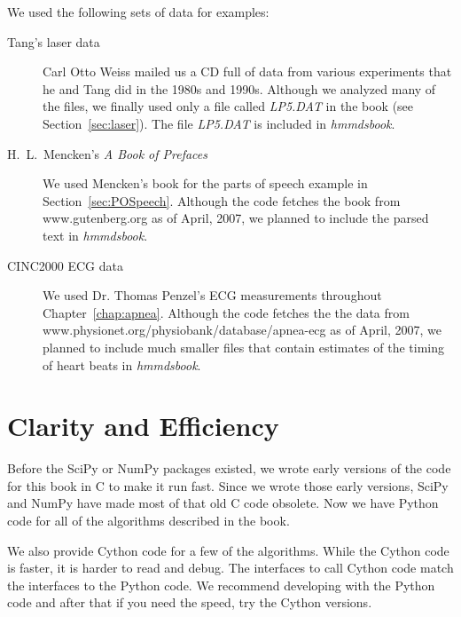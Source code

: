 We used the following sets of data for examples:
\begin{description}
\item[Tang's laser data] Carl Otto Weiss  mailed
  us a CD full of data from various experiments that he and Tang did
  in the 1980s and 1990s.  Although we analyzed many of the files, we
  finally used only a file called \emph{LP5.DAT} in the book (see
  Section~\ref{sec:laser}).  The file \emph{LP5.DAT} is included in
  \emph{hmmdsbook}.
\item[H.~L.~Mencken's \emph{A Book of Prefaces}] We used Mencken's
  book for the parts of speech example in Section~\ref{sec:POSpeech}.
  Although the code fetches the book from www.gutenberg.org as of
  April, 2007, we planned to include the parsed text in
  \emph{hmmdsbook}.
\item[CINC2000 ECG data] We used Dr. Thomas Penzel's ECG measurements
  throughout Chapter~\ref{chap:apnea}.  Although the code fetches the
  the data from\\
  www.physionet.org/physiobank/database/apnea-ecg as of April, 2007,
  we planned to include much smaller files that contain estimates of
  the timing of heart beats in \emph{hmmdsbook}.
\end{description}

\section*{Clarity and Efficiency}

Before the SciPy or NumPy packages existed, we wrote early versions of
the code for this book in C to make it run fast.  Since we wrote those
early versions, SciPy and NumPy have made most of that old C code
obsolete.  Now we have Python code for all of the algorithms described
in the book.

We also provide Cython code for a few of the algorithms.  While the
Cython code is faster, it is harder to read and debug.  The interfaces
to call Cython code match the interfaces to the Python code.  We
recommend developing with the Python code and after that if you need
the speed, try the Cython versions.

